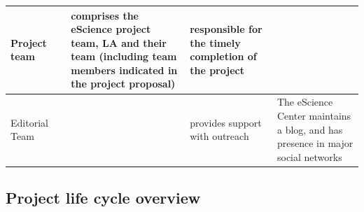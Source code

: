 \documentclass[11pt]{article}
\begin{document}
\begin{tabularx}{\linewidth}{p{}|p{}|p{}|p{}|p{}}
Project team                                       &                       & comprises the eScience project team, LA and their team (including team members indicated in the project proposal) & responsible for the timely completion of the project                                                                                                                                                                                   &                                                                                                                                      \\\hline
Editorial Team                                     &                       &                                                                                                                   & provides support with outreach                                                                                                                                                                                                         & The eScience Center maintains a blog, and has presence in major social networks                                                     
\end{tabularx}


\subsection{Project life cycle overview}
\label{sec:lifecycle}




\end{document}
